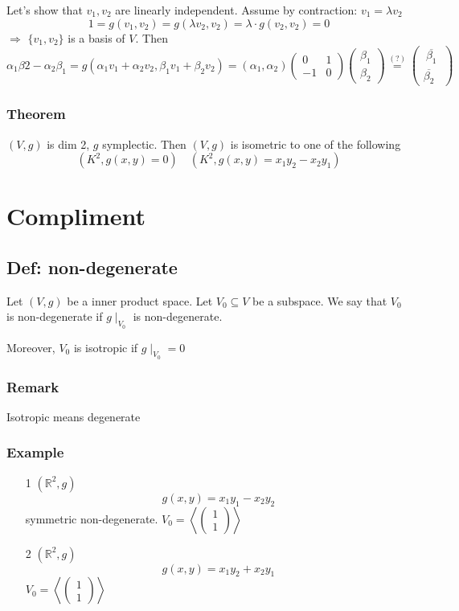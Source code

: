 \documentclass{book}
\begin{document}
Let's show that $v_1,v_2$ are linearly independent. Assume by contraction: $v_1=\lambda v_2$
$$1=g(v_1,v_2)=g(\lambda v_2,v_2)=\lambda\cdot g(v_2,v_2)=0$$
$\Rightarrow$ $\{v_1,v_2\}$ is a basis of $V$. Then
$$\alpha_1\beta2-\alpha_2\beta_1=g(\alpha_1v_1+\alpha_2v_2,\beta_1v_1+\beta_2v_2)=(\alpha_1,\alpha_2)\begin{pmatrix}
    0 &1\\-1&0
\end{pmatrix}\begin{pmatrix}
    \beta_1\\\beta_2
\end{pmatrix}\stackrel{(?)}{=}\begin{pmatrix}
    \ \overline{\beta_1}\ \\\overline{\beta_2}
\end{pmatrix}$$
\subsection{Theorem}
$(V,g)$ is dim 2, $g$ symplectic. Then $(V,g)$ is isometric to one of the following
$$(K^2,g(x,y)=0)\quad(K^2,g(x,y)=x_1y_2-x_2y_1)$$

\chapter{Compliment}
\section{Def: non-degenerate}
Let $(V,g)$ be a inner product space. Let $V_0\subseteq V$ be a subspace. We say that $V_0$ is non-degenerate if $g\mid_{V_0}$ is non-degenerate.

Moreover, $V_0$ is isotropic if $g\mid_{V_0}=0$
\subsection*{Remark}Isotropic means degenerate
\subsection*{Example}
\begin{itemize}
    \item [1]$(\mathbb{R}^2,g)$$$g(x,y)=x_1y_1-x_2y_2$$ symmetric non-degenerate. $V_0=\left<\begin{pmatrix}
        1\\1
    \end{pmatrix}\right>$
    \item [2]$(\mathbb{R}^2,g)$$$g(x,y)=x_1y_2+x_2y_1$$ $V_0=\left<\begin{pmatrix}1\\1\end{pmatrix}\right>$
\end{itemize}
\end{document}
